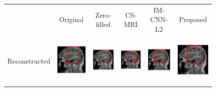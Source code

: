 \documentclass[review]{elsarticle}
\begin{document}
\begin{figure}[H]
	\begin{raggedleft}
		\hspace*{-2cm} \begin{tabular}{cccccc}
			& \multicolumn{1}{c}{\footnotesize Original} & {\footnotesize Zero-filled} & {\footnotesize CS-MRI} & {\footnotesize IM-CNN-L2} & {\footnotesize Proposed}\tabularnewline
			\multirow{1}{0.05cm}[1.8cm]{\begin{turn}{90} {\footnotesize Reconstructed} \end{turn}} &
			
			\includegraphics[width=2.5cm,height=2.5cm]{include/grp2/factor2/019-Guys-0702-T1/019-Guys-0702-T1_images__78} &
			\includegraphics[width=2.5cm,height=2.5cm]{include/grp2/factor2/019-Guys-0702-T1/019-Guys-0702-T1_images__zeroPadding_78} & \includegraphics[width=2.5cm,height=2.5cm]{include/grp2/factor2/019-Guys-0702-T1/019-Guys-0702-T1_images__CS_78} & \includegraphics[width=2.5cm,height=2.5cm]{include/grp2/factor2/019-Guys-0702-T1/019-Guys-0702-T1_images__IMCNNL2TUNE_78} & \includegraphics[width=2.5cm,height=2.5cm]{include/grp2/factor2/019-Guys-0702-T1/019-Guys-0702-T1_images__predict_78}
			

\end{tabular}
\end{raggedleft}
\end{figure}
\end{document}
